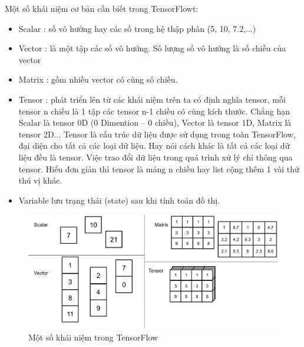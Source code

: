 Một số khái niệm cơ bản cần biết trong TensorFlowt:
\begin{itemize}
\item Scalar : số vô hướng hay các số trong hệ thập phân (5, 10, 7.2,...)
\item Vector : là một tập các số vô hướng. Số lượng số vô hướng là số chiều của vector
\item Matrix : gồm nhiều vector có cùng số chiều.
\item Tensor : phát triển lên từ các khái niệm trên ta có định nghĩa tensor, mỗi tensor n chiều là 1 tập các tensor n-1 chiều có cùng kích thước. Chẳng hạn Scalar là tensor 0D (0 Dimention – 0 chiều), Vector là tensor 1D, Matrix là tensor 2D... Tensor là cấu trúc dữ liệu được sử dụng trong toàn TensorFlow, đại diện cho tất cả các loại dữ liệu. Hay nói cách khác là tất cả các loại dữ liệu đều là tensor. Việc trao đổi dữ liệu trong quá trình xử lý chỉ thông qua tensor. Hiểu đơn giản thì tensor là mảng n chiều hay list cộng thêm 1 vài thứ thú vị khác.
\item Variable lưu trạng thái (state) sau khi tính toán đồ thị.
\end{itemize}

\begin{center}
    \begin{figure}[h!]
    \begin{center}
     \includegraphics[scale=0.3]{img/tensor.png}
    \end{center}
    \caption{Một số khái niệm trong TensorFlow \cite{tensor}}
    \label{refhinh22}
    \end{figure}
\end{center}
